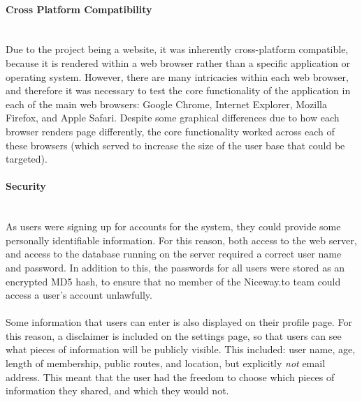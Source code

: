 \paragraph{Cross Platform Compatibility}\ \\
Due to the project being a website, it was inherently cross-platform compatible, because it is rendered within a web browser rather than a specific application or operating system. However, there are many intricacies within each web browser, and therefore it was necessary to test the core functionality of the application in each of the main web browsers: Google Chrome, Internet Explorer, Mozilla Firefox, and Apple Safari. Despite some graphical differences due to how each browser renders page differently, the core functionality worked across each of these browsers (which served to increase the size of the user base that could be targeted).

\paragraph{Security}\ \\
As users were signing up for accounts for the system, they could provide some personally identifiable information. For this reason, both access to the web server, and access to the database running on the server required a correct user name and password. In addition to this, the passwords for all users were stored as an encrypted MD5 hash, to ensure that no member of the Niceway.to team could access a user's account unlawfully. \ \\
\ \\
Some information that users can enter is also displayed on their profile page. For this reason, a disclaimer is included on the settings page, so that users can see what pieces of information will be publicly visible. This included: user name, age, length of membership, public routes, and location, but explicitly \textit{not} email address. This meant that the user had the freedom to choose which pieces of information they shared, and which they would not.

